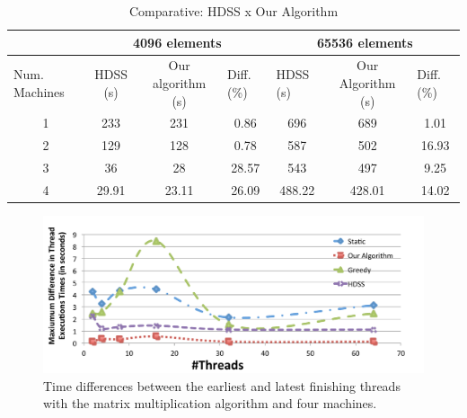 \documentclass[journal]{IEEEtran}
\begin{document}
\begin{table}[htb]
\centering
\caption{Comparative: HDSS x Our Algorithm}

\begin{tabular}{c|c|c|c|c|c|c|}
\cline{2-7}
\multicolumn{1}{l|}{}                 & \multicolumn{3}{c|}{4096 elements}                              & \multicolumn{3}{c|}{65536 elements}                                                  \\ \hline
\multicolumn{1}{|l|}{Num. Machines} & HDSS (s) & Our algorithm (s) & \multicolumn{1}{l|}{Diff. (\%)} & \multicolumn{1}{l|}{HDSS (s)} & Our Algorithm (s) & \multicolumn{1}{l|}{Diff. (\%)} \\ \hline
\multicolumn{1}{|c|}{1 }       & 233     & 231              &   0.86                        
			 & 696                          &   689             &    1.01                        \\ \hline
\multicolumn{1}{|c|}{2 }      & 129     & 128              &    0.78                         
				& 587                         & 502             & 16.93                     \\ \hline
\multicolumn{1}{|c|}{3 }      & 36     & 28              & 28.57                            
			&          543                &    497           &      9.25                          \\ \hline
\multicolumn{1}{|c|}{4 }      & 29.91     & 23.11            & 26.09                       
			    & 488.22                          & 428.01              &     14.02            \\ \hline
\end{tabular}
\label{table: comparativo}
\end{table}

\begin{figure}[htb]
	\begin{center}
	\centering
			\includegraphics[scale=0.345]{MaximoDiferenca_matrix_novo.pdf}
	\caption{Time differences between the earliest and latest finishing
          threads with the matrix multiplication algorithm and four machines.}
	\label{fig:diferencaThreads}
	\end{center}
\end{figure}
\end{document}
